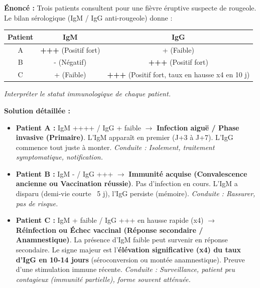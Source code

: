 \documentclass[11pt]{article}
\newcommand{\cle}[1]{{\popxbold\color{popdark}#1}}
\begin{document}
\begin{exoresolu}
\textbf{Énoncé :} Trois patients consultent pour une fièvre éruptive suspecte de rougeole. Le bilan sérologique (IgM / IgG anti-rougeole) donne :
\begin{center}
\begin{tabular}{|c|c|c|}\hline
\textbf{Patient} & \textbf{IgM} & \textbf{IgG} \\ \hline
A & \textbf{+++} (Positif fort) & + (Faible) \\ \hline
B & - (Négatif) & \textbf{+++} (Positif fort) \\ \hline
C & + (Faible) & \textbf{+++} (Positif fort, taux en hausse x4 en 10 j) \\ \hline
\end{tabular}
\end{center}
\textit{Interpréter le statut immunologique de chaque patient.}

\textbf{Solution détaillée :}
\begin{itemize}
    \item \textbf{Patient A :} \cle{IgM ++++ / IgG + faible} $\rightarrow$ \textbf{Infection aiguë / Phase invasive (Primaire)}. L'IgM apparaît en premier (J+3 à J+7). L'IgG commence tout juste à monter. \textit{Conduite : Isolement, traitement symptomatique, notification.}
    \item \textbf{Patient B :} \cle{IgM - / IgG +++} $\rightarrow$ \textbf{Immunité acquise (Convalescence ancienne ou Vaccination réussie)}. Pas d'infection en cours. L'IgM a disparu (demi-vie courte ~5 j), l'IgG persiste (mémoire). \textit{Conduite : Rassurer, pas de risque.}
    \item \textbf{Patient C :} \cle{IgM + faible / IgG +++ en hausse rapide (x4)} $\rightarrow$ \textbf{Réinfection ou Échec vaccinal (Réponse secondaire / Anamnestique)}. La présence d'IgM faible peut survenir en réponse secondaire. Le signe majeur est l'\textbf{élévation significative (x4) du taux d'IgG en 10-14 jours} (séroconversion ou montée anamnestique). Preuve d'une stimulation immune récente. \textit{Conduite : Surveillance, patient peu contagieux (immunité partielle), forme souvent atténuée.}
\end{itemize}
\end{exoresolu}
\end{document}
